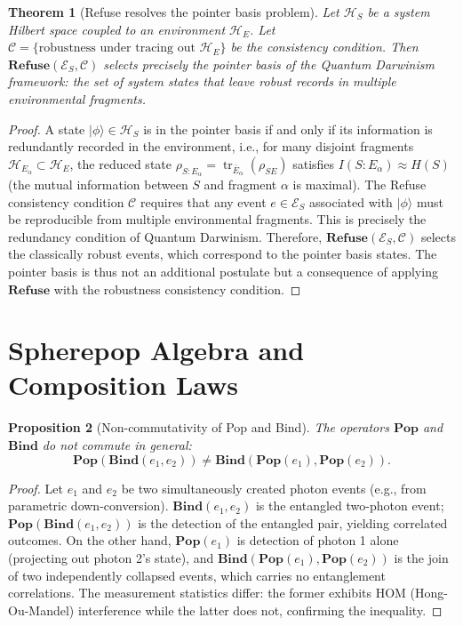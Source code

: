 \documentclass[11pt, openright, twoside]{book}
\theoremstyle{plain}
\newtheorem{theorem}{Theorem}[chapter]
\newtheorem{proposition}[theorem]{Proposition}
\theoremstyle{definition}
\theoremstyle{remark}
\newcommand{\Pop}{\mathbf{Pop}}
\newcommand{\Bind}{\mathbf{Bind}}
\newcommand{\Refuse}{\mathbf{Refuse}}
\begin{document}
\begin{theorem}[Refuse resolves the pointer basis problem]
\label{thm:refuse_pointer}
Let $\mathcal{H}_S$ be a system Hilbert space coupled to an environment $\mathcal{H}_E$.
Let $\mathcal{C} = \{\text{robustness under tracing out } \mathcal{H}_E\}$ be the
consistency condition. Then $\Refuse(\mathcal{E}_S, \mathcal{C})$ selects precisely the
pointer basis of the Quantum Darwinism framework: the set of system states that leave
robust records in multiple environmental fragments.
\end{theorem}

\begin{proof}
A state $|\phi\rangle \in \mathcal{H}_S$ is in the pointer basis if and only if its
information is redundantly recorded in the environment, i.e., for many disjoint fragments
$\mathcal{H}_{E_\alpha} \subset \mathcal{H}_E$, the reduced state $\rho_{S:E_\alpha} =
\operatorname{tr}_{\bar E_\alpha}(\rho_{SE})$ satisfies
$I(S:E_\alpha) \approx H(S)$ (the mutual information between $S$ and fragment $\alpha$
is maximal). The Refuse consistency condition $\mathcal{C}$ requires that any event
$e \in \mathcal{E}_S$ associated with $|\phi\rangle$ must be reproducible from multiple
environmental fragments. This is precisely the redundancy condition of Quantum Darwinism.
Therefore, $\Refuse(\mathcal{E}_S, \mathcal{C})$ selects the classically robust events,
which correspond to the pointer basis states. The pointer basis is thus not an additional
postulate but a consequence of applying $\Refuse$ with the robustness consistency condition.
\end{proof}

\section{Spherepop Algebra and Composition Laws}

\begin{proposition}[Non-commutativity of Pop and Bind]
\label{prop:noncommute}
The operators $\Pop$ and $\Bind$ do not commute in general:
\begin{equation}
  \Pop(\Bind(e_1, e_2)) \neq \Bind(\Pop(e_1), \Pop(e_2)).
  \label{eq:noncommute}
\end{equation}
\end{proposition}

\begin{proof}
Let $e_1$ and $e_2$ be two simultaneously created photon events (e.g., from parametric
down-conversion). $\Bind(e_1, e_2)$ is the entangled two-photon event; $\Pop(\Bind(e_1,e_2))$
is the detection of the entangled pair, yielding correlated outcomes. On the other hand,
$\Pop(e_1)$ is detection of photon 1 alone (projecting out photon 2's state), and
$\Bind(\Pop(e_1), \Pop(e_2))$ is the join of two independently collapsed events, which
carries no entanglement correlations. The measurement statistics differ: the former exhibits
HOM (Hong-Ou-Mandel) interference while the latter does not, confirming the inequality.
\end{proof}
\end{document}
